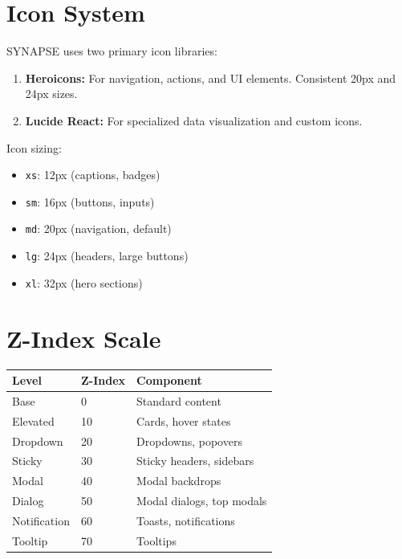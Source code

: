 \documentclass{report}
\begin{document}
\section{Icon System}

SYNAPSE uses two primary icon libraries:

\begin{enumerate}
    \item \textbf{Heroicons:} For navigation, actions, and UI elements. Consistent 20px and 24px sizes.
    \item \textbf{Lucide React:} For specialized data visualization and custom icons.
\end{enumerate}

Icon sizing:
\begin{itemize}
    \item \texttt{xs}: 12px (captions, badges)
    \item \texttt{sm}: 16px (buttons, inputs)
    \item \texttt{md}: 20px (navigation, default)
    \item \texttt{lg}: 24px (headers, large buttons)
    \item \texttt{xl}: 32px (hero sections)
\end{itemize}

\section{Z-Index Scale}

\begin{table}[h]
\centering
\begin{tabular}{|l|l|l|}
\hline
\textbf{Level} & \textbf{Z-Index} & \textbf{Component} \\
\hline
Base & 0 & Standard content \\
\hline
Elevated & 10 & Cards, hover states \\
\hline
Dropdown & 20 & Dropdowns, popovers \\
\hline
Sticky & 30 & Sticky headers, sidebars \\
\hline
Modal & 40 & Modal backdrops \\
\hline
Dialog & 50 & Modal dialogs, top modals \\
\hline
Notification & 60 & Toasts, notifications \\
\hline
Tooltip & 70 & Tooltips \\
\hline
\end{tabular}
\end{table}
\end{document}
